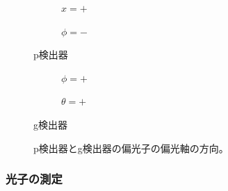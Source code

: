 \documentclass[10pt,b5paper,papersize,dvipdfmx]{jsbook}
\begin{document}
\begin{figure}[htb] \centering \small
  \begin{minipage}[c]{0.3\linewidth}\centering
    \begin{subfigure}{\textwidth}\centering
      \caption{$x=+$} \label{subfig:a}
    \end{subfigure}
    \begin{subfigure}{\textwidth}\centering
      \caption{$\phi=-$} \label{subfig:b}
    \end{subfigure}
    p検出器
  \end{minipage}
  \begin{minipage}[c]{0.3\linewidth}\centering
    \begin{subfigure}{\textwidth}\centering
      \caption{$\phi=+$} \label{subfig:c}
    \end{subfigure}
    \begin{subfigure}{\textwidth}\centering
      \caption{$\theta=+$} \label{subfig:d}
    \end{subfigure}
    g検出器
  \end{minipage}
  \caption{p検出器とg検出器の偏光子の偏光軸の方向。}
  \label{fig:henkou-jiku}
\end{figure}
%
\subsubsection{光子の測定} %
\end{document}

